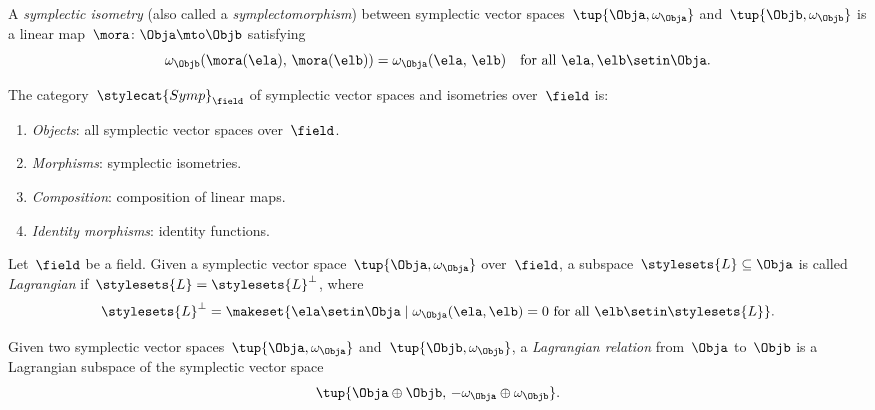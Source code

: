 {\begin{ctdefinition}
    A \emph{symplectic isometry} (also called a \emph{symplectomorphism}) between symplectic vector spaces~$\tup{\Obja, \omega_\Obja}$ and~$\tup{\Objb, \omega_\Objb}$ is a linear map~$\mora \colon \Obja \mto \Objb$ satisfying
    \begin{equation}
        \omega_\Objb(\mora(\ela),\, \mora(\elb)) = \omega_\Obja(\ela,\, \elb) \quad \text{for all } \ela, \elb \setin \Obja.
    \end{equation}

    The category~$\stylecat{Symp}_\field$ of symplectic vector spaces and isometries over~$\field$ is:
    \begin{enumerate}
        \item \emph{Objects}: all symplectic vector spaces over~$\field$.
        \item \emph{Morphisms}: symplectic isometries.
        \item \emph{Composition}: composition of linear maps.
        \item \emph{Identity morphisms}: identity functions.
    \end{enumerate}
\end{ctdefinition}



\begin{ctdefinition}
    \label{def:cat-of-lagrangian-relations}
    Let~$\field$ be a field.
    Given a symplectic vector space~$\tup{\Obja, \omega_\Obja}$ over~$\field$, a subspace~$\stylesets{L} \subseteq \Obja$ is called \emph{Lagrangian} if~$\stylesets{L} = \stylesets{L}^\perp$, where
    \begin{equation}
        \stylesets{L}^\perp = \makeset{ \ela \setin \Obja \mid \omega_\Obja(\ela, \elb) = 0 \text{ for all } \elb \setin \stylesets{L} }.
    \end{equation}

    Given two symplectic vector spaces~$\tup{\Obja, \omega_\Obja}$ and~$\tup{\Objb, \omega_\Objb}$, a \emph{Lagrangian relation} from~$\Obja$ to~$\Objb$ is a Lagrangian subspace of the symplectic vector space
    $$\tup{\Obja \oplus \Objb,\, -\omega_\Obja \oplus \omega_\Objb}.$$


\end{ctdefinition}}
